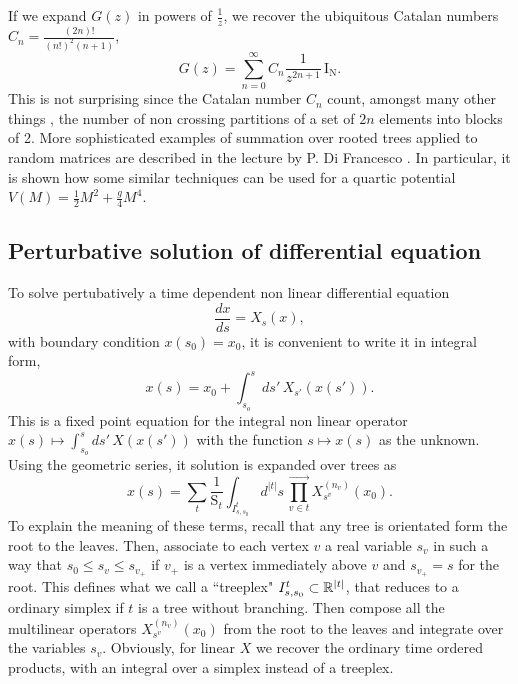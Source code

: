 \documentclass[12pt,here,feynmf]{article}
\begin{document}
If we expand $G(z)$ in powers of $\frac{1}{z}$, we recover the ubiquitous Catalan numbers $C_{n}=\frac{(2n)!}{(n!)^{2}(n+1)}$,
\begin{equation}
G(z)=\sum_{n=0}^{\infty}C_{n}\frac{1}{z^{2n+1}}\,\mathrm{I_{N}}.
\end{equation}
This is not surprising since the Catalan number $C_{n}$ count, amongst many other things \cite{stanley}, the number of non crossing partitions of a set of $2n$ elements into blocks of 2. More sophisticated examples of summation over rooted trees applied to random matrices are described in the lecture by P. Di Francesco \cite{difrancesco}. In particular, it is shown how some similar techniques can be used for a quartic potential $V(M)=\frac{1}{2}M^{2}+\frac{g}{4}M^{4}$.



\subsection{Perturbative solution of differential equation}

\label{diffsec}

To solve pertubatively a time dependent non linear differential equation
\begin{equation}
\frac{dx}{ds}=X_{s}(x),\label{timede}
\end{equation}
with boundary condition $ x(s_{0})=x_{0}$, it is convenient to write it in integral form,
\begin{equation}
x(s)=x_{0}+\int_{s_{o}}^{s}ds'\, X_{s'}(x(s')).
\end{equation}
This is a fixed point equation for the integral non linear operator $x(s)\mapsto\int_{s_{o}}^{s}ds'\, X(x(s'))$ with the function $s\mapsto x(s)$ as the unknown. Using the geometric series, it solution is expanded over trees as
\begin{equation} 
x(s)=\sum_{t}\frac{1}{\mathrm{S}_{t}}\int_{I^{t}_{s,s_{0}}}\!\!d^{|t|}s\,
\prod_{v\in t}^{\longrightarrow}X_{s^{v}}^{(n_{v})}(x_{0}).
\end{equation}
To explain the meaning of these terms, recall that any tree is orientated form the root to the leaves. Then, associate to each vertex $v$ a real variable  $s_{v}$ in such a way that $s_{0}\leq s_{v}\leq s_{v_{+}}$ if $v_{+}$ is a vertex immediately above $v$  and $s_{v_{+}}=s$ for the root. This defines what we call a  ``treeplex" $I^{t}_{s,s_{0}}\subset{\Bbb R}^{|t|}$, that reduces to a ordinary simplex if  $t$ is a  tree without branching. Then compose all the multilinear operators $X_{s^{v}}^{(n_{v})}(x_{0})$ from the root to the leaves and integrate over the variables $s_{v}$. Obviously, for linear $X$ we recover the ordinary time ordered products, with an integral over a simplex instead of a treeplex. 
\end{document}
